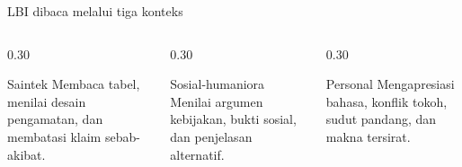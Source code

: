 \begin{frame}{LBI dibaca melalui tiga konteks}
  \begin{columns}[T,onlytextwidth]
    \begin{column}{0.30\textwidth}
      \begin{block}{Saintek}
        Membaca tabel, menilai desain pengamatan, dan membatasi klaim sebab-akibat.
      \end{block}
    \end{column}
    \begin{column}{0.30\textwidth}
      \begin{block}{Sosial-humaniora}
        Menilai argumen kebijakan, bukti sosial, dan penjelasan alternatif.
      \end{block}
    \end{column}
    \begin{column}{0.30\textwidth}
      \begin{block}{Personal}
        Mengapresiasi bahasa, konflik tokoh, sudut pandang, dan makna tersirat.
      \end{block}
    \end{column}
  \end{columns}
  \vspace{0.25cm}
\end{frame}

